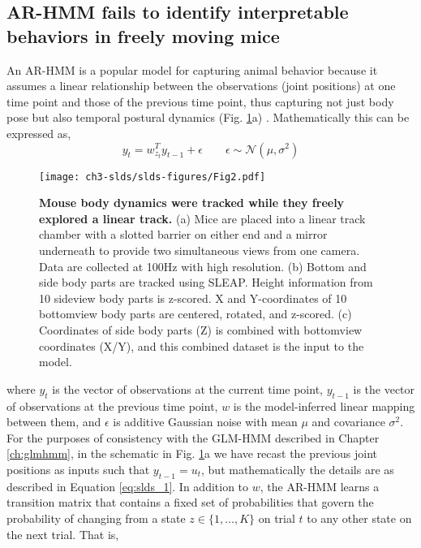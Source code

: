 \subsection{AR-HMM fails to identify interpretable behaviors in freely moving mice}
\label{sec:slds:3.2.2}

An AR-HMM is a popular model for capturing animal behavior because it assumes a linear relationship between the observations (joint positions) at one time point and those of the previous time point, thus capturing not just body pose but also temporal postural dynamics (Fig. \ref{fig:slds:2}a) \cite{wiltschko_mapping_2015, datta_computational_2019, datta_q_2019}. Mathematically this can be expressed as,
\begin{equation} \label{eq:slds_1}
y_t = w_{z_t}^T y_{t-1} + \epsilon \qquad \epsilon \sim \mathcal{N}(\mu,\sigma^2)
\end{equation}

\begin{figure}[t!]
  \begin{center}
    \texttt{[image: ch3-slds/slds-figures/Fig2.pdf]}
    \caption[Mouse body dynamics were tracked while they freely explored a linear track]{\textbf{Mouse body dynamics were tracked while they freely explored a linear track.} (a) Mice are placed into a linear track chamber with a slotted barrier on either end and a mirror underneath to provide two simultaneous views from one camera. Data are collected at 100Hz with high resolution. (b) Bottom and side body parts are tracked using SLEAP. Height information from 10 sideview body parts is z-scored. X and Y-coordinates of 10 bottomview body parts are centered, rotated, and z-scored. (c) Coordinates of side body parts (Z) is combined with bottomview coordinates (X/Y), and this combined dataset is the input to the model. }
    \label{fig:slds:2}
  \end{center}
\end{figure}
where $y_t$ is the vector of observations at the current time point, $y_{t-1}$ is the vector of observations at the previous time point, $w$ is the model-inferred linear mapping between them, and $\epsilon$ is additive Gaussian noise with mean $\mu$ and covariance $\sigma^2$. For the purposes of consistency with the GLM-HMM described in Chapter \ref{ch:glmhmm}, in the schematic in Fig. \ref{fig:slds:2}a we have recast the previous joint positions as inputs such that $y_{t-1}=u_t$, but mathematically the details are as described in Equation \ref{eq:slds_1}. In addition to $w$, the AR-HMM learns a transition matrix that contains a fixed set of probabilities that govern the probability of changing from a state $z \in \{ 1, \ldots ,K\}$ on trial $t$ to any other state on the next trial. That is, 

